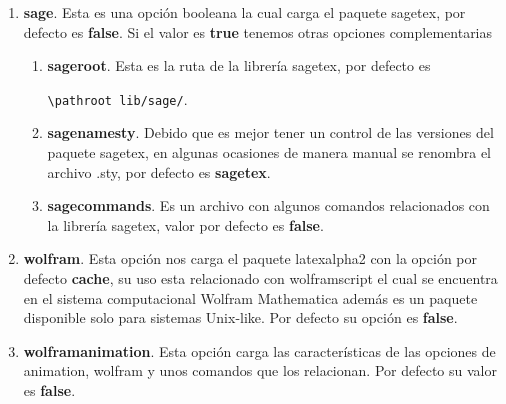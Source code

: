 {\begin{enumerate}
		\item \textbf{sage}. Esta es una opción booleana la cual carga el paquete sagetex, por defecto es \textbf{false}. Si el valor es \textbf{true} tenemos otras opciones complementarias
		\begin{enumerate}
			\item \textbf{sageroot}.
			Esta es la ruta de la librería sagetex, por defecto es 
			\begin{center}
				\verb|\pathroot lib/sage/|.
			\end{center}
			\item \textbf{sagenamesty}. Debido que es mejor tener un control de las versiones del paquete sagetex, en algunas ocasiones de manera manual se renombra el archivo .sty, por defecto es \textbf{sagetex}.
			\item \textbf{sagecommands}. Es un archivo con algunos comandos relacionados con la librería sagetex, valor por defecto es \textbf{false}.
		\end{enumerate}
		\item \textbf{wolfram}. Esta opción nos carga el paquete latexalpha2 con la opción por defecto \textbf{cache}, su uso esta relacionado con wolframscript el cual se encuentra en el sistema computacional Wolfram Mathematica además es un paquete disponible solo para sistemas Unix-like. Por defecto su opción es \textbf{false}.
		\item \textbf{wolframanimation}. Esta opción carga las características de las opciones de animation, wolfram y unos comandos que los relacionan. Por defecto su valor es \textbf{false}.
	\end{enumerate}
}
